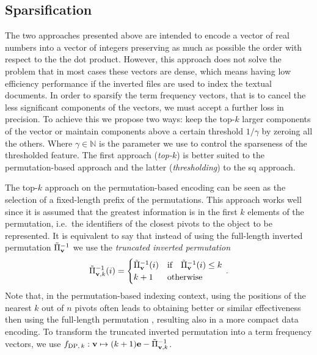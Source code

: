 \subsection{Sparsification}
The two approaches presented above are intended to encode a vector of real numbers into a vector of integers preserving as much as possible the order with respect to the the dot product.
However, this approach does not solve the problem that in most cases these vectors are dense, which means having low efficiency performance if the inverted files are used to index the textual documents.
In order to sparsify the term frequency vectors, that is to cancel the less significant components of the vectors, we must accept a further loss in precision.
To achieve this we propose two ways: keep the top-$k$ larger components of the vector or maintain components above a certain threshold $1/\gamma$ by zeroing all the others.
Where $\gamma \in \mathbb{N}$ is the parameter we use to control the sparseness of the thresholded feature.
The first approach (\emph{top-$k$}) is better suited to the permutation-based approach and the latter (\emph{thresholding}) to the \gls{sq} approach.

The top-$k$ approach on the permutation-based encoding can be seen as the selection of a fixed-length prefix of the permutations.
This approach works well since it is assumed that the greatest information is in the first $k$ elements of the permutation, i.e.\ the identifiers of the closest pivots to the object to be represented.
It is equivalent to say that instead of using the full-length inverted permutation $\tilde{\Pi}^{-1}_{\mathbf{v}}$  we use the \emph{truncated inverted permutation}
\begin{equation}
\tilde{\Pi}^{-1}_{\mathbf{v},k}(i) = \begin{cases}
                                \tilde{\Pi}^{-1}_{\mathbf{v}} (i) & \text{if} \quad \tilde{\Pi}^{-1}_{\mathbf{v}}(i) \leq k \\
                                k+1                       & \text{otherwise}
                             \end{cases} \,.
\end{equation}
Note that, in the permutation-based indexing context, using the positions of the {nearest} $k$ out of $n$ pivots often leads to obtaining better or similar effectiveness then using the full-length permutation \cite{amato2014mi,amato2014some}, resulting also in a more compact data encoding.
To transform the truncated inverted permutation into a term frequency vectors, we use $f_{\text{DP},\,k} : \mathbf{v} \mapsto (k+1)\mathbf{e} -\tilde{\Pi}^{-1}_{\mathbf{v},k}$.

